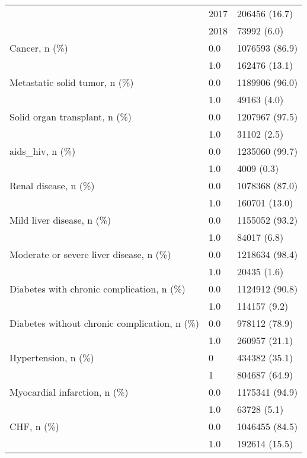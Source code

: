\begin{tabular}{lll}
                                       & 2017 &      206456 (16.7) \\
                                       & 2018 &        73992 (6.0) \\
Cancer, n (\%) & 0.0 &     1076593 (86.9) \\
                                       & 1.0 &      162476 (13.1) \\
Metastatic solid tumor, n (\%) & 0.0 &     1189906 (96.0) \\
                                       & 1.0 &        49163 (4.0) \\
Solid organ transplant, n (\%) & 0.0 &     1207967 (97.5) \\
                                       & 1.0 &        31102 (2.5) \\
aids\_hiv, n (\%) & 0.0 &     1235060 (99.7) \\
                                       & 1.0 &         4009 (0.3) \\
Renal disease, n (\%) & 0.0 &     1078368 (87.0) \\
                                       & 1.0 &      160701 (13.0) \\
Mild liver disease, n (\%) & 0.0 &     1155052 (93.2) \\
                                       & 1.0 &        84017 (6.8) \\
Moderate or severe liver disease, n (\%) & 0.0 &     1218634 (98.4) \\
                                       & 1.0 &        20435 (1.6) \\
Diabetes with chronic complication, n (\%) & 0.0 &     1124912 (90.8) \\
                                       & 1.0 &       114157 (9.2) \\
Diabetes without chronic complication, n (\%) & 0.0 &      978112 (78.9) \\
                                       & 1.0 &      260957 (21.1) \\
Hypertension, n (\%) & 0 &      434382 (35.1) \\
                                       & 1 &      804687 (64.9) \\
Myocardial infarction, n (\%) & 0.0 &     1175341 (94.9) \\
                                       & 1.0 &        63728 (5.1) \\
CHF, n (\%) & 0.0 &     1046455 (84.5) \\
                                       & 1.0 &      192614 (15.5) \\

\end{tabular}
